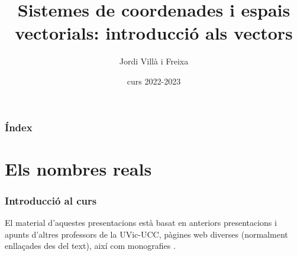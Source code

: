 \documentclass{beamer}
\title[Vectors]{Sistemes de coordenades i espais vectorials: introducció als vectors} %
\author{Jordi Villà i Freixa} %
\institute[FCTE] %
{
Universitat de Vic - Universitat Central de Catalunya \\
Grau en Multimèdia. Aplicacions i Videojocs\\ %
\medskip
\textit{jordi.villa@uvic.cat} %
}
\date{curs 2022-2023}
\begin{document}
\begin{frame}
\titlepage %
\end{frame}

\begin{frame}
\frametitle{Índex} %
\tableofcontents %
\end{frame}


\section{Els nombres reals} %

\begin{frame}
\frametitle{Introducció al curs}
El material d'aquestes presentacions està basat en anteriors presentacions i apunts d'altres professors \cite{jlgarcia,mcorbera,mcalle} de la UVic-UCC, pàgines web diverses (normalment enllaçades des del text), així com monografies \cite{vanverth,schaum,riley}.
\end{frame}
\end{document}
